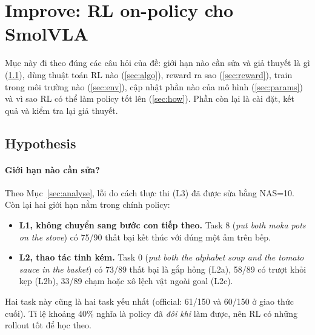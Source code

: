 \documentclass[10pt,a4paper]{article}
\begin{document}
\section{Improve: RL on-policy cho SmolVLA}

Mục này đi theo đúng các câu hỏi của đề: giới hạn nào cần sửa và giả thuyết là gì (\ref{sec:hyp}), dùng thuật toán RL
nào (\ref{sec:algo}), reward ra sao (\ref{sec:reward}), train trong môi trường nào (\ref{sec:env}), cập nhật phần nào
của mô hình (\ref{sec:params}) và vì sao RL có thể làm policy tốt lên (\ref{sec:how}). Phần còn lại là cài đặt, kết quả
và kiểm tra lại giả thuyết.

\subsection{Hypothesis}\label{sec:hyp}

\paragraph{Giới hạn nào cần sửa?}
Theo Mục~\ref{sec:analyse}, lỗi do cách thực thi (L3) đã được sửa bằng NAS=10. Còn lại hai giới hạn nằm trong chính policy:
\begin{itemize}
\item \textbf{L1, không chuyển sang bước con tiếp theo.} Task 8 (\emph{put both moka pots on the stove}) có 75/90
thất bại kết thúc với đúng một ấm trên bếp.
\item \textbf{L2, thao tác tinh kém.} Task 0 (\emph{put both the alphabet soup and the tomato sauce in the basket}) có
73/89 thất bại là gắp hỏng (L2a), 58/89 có trượt khỏi kẹp (L2b), 33/89 chạm hoặc xô lệch vật ngoài goal (L2c).
\end{itemize}
Hai task này cũng là hai task yếu nhất (official: 61/150 và 60/150 ở giao thức cuối). Tỉ lệ khoảng 40\% nghĩa là
policy đã \emph{đôi khi} làm được, nên RL có những rollout tốt để học theo.
\end{document}
